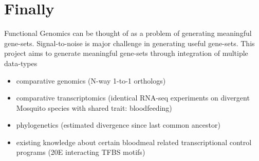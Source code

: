 \section{Finally}

Functional Genomics can be thought of as a problem of generating meaningful gene-sets.
Signal-to-noise is major challenge in generating useful gene-sets. This project aims to generate meaningful gene-sets through integration of multiple data-types

\begin{itemize}
    \item comparative genomics (N-way 1-to-1 orthologs)

    \item comparative transcriptomics (identical RNA-seq experiments on divergent Mosquito species with shared trait: bloodfeeding)

    \item phylogenetics (estimated divergence since last common ancestor)

    \item existing knowledge about certain bloodmeal related transcriptional control programs (20E interacting TFBS motifs)
\end{itemize}




